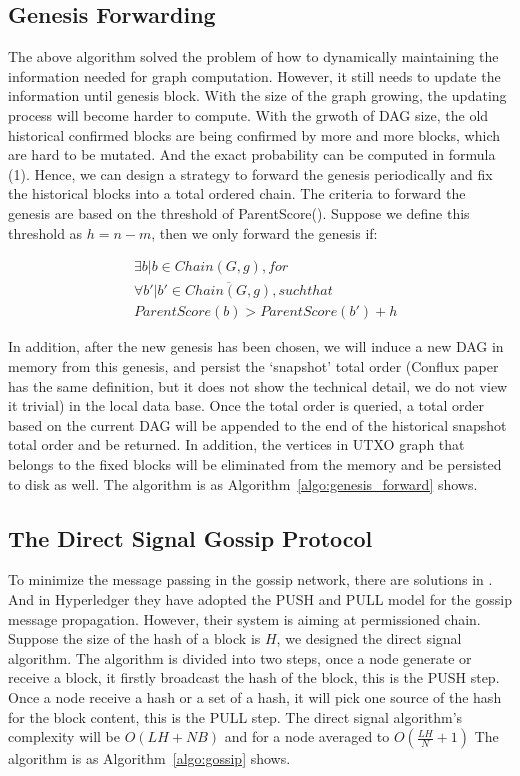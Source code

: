 \subsection{Genesis Forwarding}
The above algorithm solved the problem of how to dynamically maintaining the information needed for graph computation.
However, it still needs to update the information until genesis block. 
With the size of the graph growing, the updating process will become harder to compute.
With the grwoth of DAG size, the old historical confirmed blocks are being confirmed by more and more blocks, 
which are hard to be mutated.
And the exact probability can be computed in formula (1).
Hence, we can design a strategy to forward the genesis periodically and fix the historical blocks into a total ordered chain.
The criteria to forward the genesis are based on the threshold of ParentScore().
Suppose we define this threshold as $h = n-m $, then we only forward the genesis if: 

\begin{equation}
    \begin{flalign*}
        & \exists b | b \in Chain(G, g), for \\ 
        & \forall b' | b' \in \overline{Chain(G,g)}, such that \\
        & ParentScore(b) > ParentScore(b') + h 
    \end{flalign*}
\end{equation}

In addition, after the new genesis has been chosen, 
we will induce a new DAG in memory from this genesis,
and persist the `snapshot' total order (Conflux paper has the same definition, 
but it does not show the technical detail, we do not view it trivial) in the local data base.
Once the total order is queried, a total order based on the current DAG will be appended to the end of the historical
snapshot total order and be returned.
In addition, the vertices in UTXO graph that belongs to the fixed blocks will 
be eliminated from the memory and be persisted to disk as well.  
The algorithm is as Algorithm~\ref{algo:genesis_forward} shows.



\subsection{The Direct Signal Gossip Protocol}
To minimize the message passing in the gossip network,
there are solutions in \cite{demers1988epidemic}. And in Hyperledger \cite{androulaki2018hyperledger}
they have adopted the PUSH and PULL model for the gossip message propagation. However, their system is aiming at permissioned chain.
Suppose the size of the hash of a block is $H$, we designed the direct signal algorithm.
The algorithm is divided into two steps, once a node generate or receive a block,
it firstly broadcast the hash of the block, this is the PUSH step.
Once a node receive a hash or a set of a hash,
it will pick one source of the hash for the block content, this is the PULL step.
The direct signal algorithm's complexity will be $O(LH + NB)$ and for a node averaged to $O(\frac{LH}{N} + 1)$
The algorithm is as Algorithm~\ref{algo:gossip} shows.


